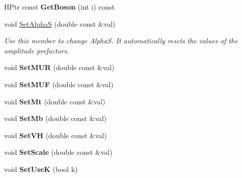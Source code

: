 \begin{DoxyCompactItemize}
\item 
\hypertarget{classHiggsModel_ae082694ec944cffd807f4f0a20bf931b}{}H\+Ptr const {\bfseries Get\+Boson} (int i) const \label{classHiggsModel_ae082694ec944cffd807f4f0a20bf931b}

\item 
\hypertarget{classHiggsModel_a5a3f7171856b2106141948544fc49f13}{}void \hyperlink{classHiggsModel_a5a3f7171856b2106141948544fc49f13}{Set\+Alpha\+S} (double const \&val)\label{classHiggsModel_a5a3f7171856b2106141948544fc49f13}

\begin{DoxyCompactList}\small\item\em Use this member to change Alpha\+S. It automatically resets the values of the amplitude prefactors. \end{DoxyCompactList}\item 
\hypertarget{classHiggsModel_a40b498b2555458a9abc4ea989e72ce91}{}void {\bfseries Set\+M\+U\+R} (double const \&val)\label{classHiggsModel_a40b498b2555458a9abc4ea989e72ce91}

\item 
\hypertarget{classHiggsModel_a8e8772814f7441352b226eb0566a263e}{}void {\bfseries Set\+M\+U\+F} (double const \&val)\label{classHiggsModel_a8e8772814f7441352b226eb0566a263e}

\item 
\hypertarget{classHiggsModel_a511bd13bf20268e59567b2049d7a5781}{}void {\bfseries Set\+Mt} (double const \&val)\label{classHiggsModel_a511bd13bf20268e59567b2049d7a5781}

\item 
\hypertarget{classHiggsModel_a460c285dbbd117c30be6ea43f5271e2d}{}void {\bfseries Set\+Mb} (double const \&val)\label{classHiggsModel_a460c285dbbd117c30be6ea43f5271e2d}

\item 
\hypertarget{classHiggsModel_a058daf0cc3b8cad4077419d19d8e4c21}{}void {\bfseries Set\+V\+H} (double const \&val)\label{classHiggsModel_a058daf0cc3b8cad4077419d19d8e4c21}

\item 
\hypertarget{classHiggsModel_aaca4ad2dcfd40c87e76fc88ab95b56dc}{}void {\bfseries Set\+Scale} (double const \&val)\label{classHiggsModel_aaca4ad2dcfd40c87e76fc88ab95b56dc}

\item 
\hypertarget{classHiggsModel_a0f932c9eddbc1d0f93b97135c2db468d}{}void {\bfseries Set\+Use\+K} (bool k)\label{classHiggsModel_a0f932c9eddbc1d0f93b97135c2db468d}


\end{DoxyCompactItemize}
